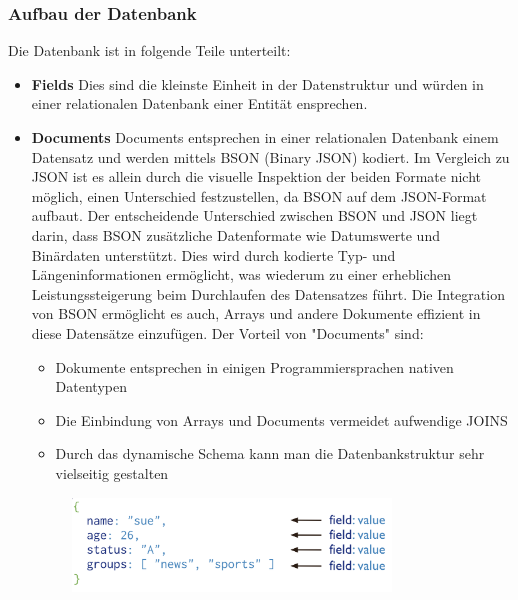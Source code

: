 \subsubsection{Aufbau der Datenbank}
Die Datenbank ist in folgende Teile unterteilt:

\begin{itemize}
    \item \textbf{Fields}
        \newline
        Dies sind die kleinste Einheit in der Datenstruktur und würden in einer relationalen Datenbank einer Entität ensprechen.
    \item \textbf{Documents}
        \newline
        Documents entsprechen in einer relationalen Datenbank einem Datensatz und werden mittels BSON (Binary JSON) kodiert. Im Vergleich zu JSON ist es allein durch die visuelle Inspektion der beiden Formate nicht möglich, einen Unterschied festzustellen, da BSON auf dem JSON-Format aufbaut.
        \newline
        Der entscheidende Unterschied zwischen BSON und JSON liegt darin, dass BSON zusätzliche Datenformate wie Datumswerte und Binärdaten unterstützt. Dies wird durch kodierte Typ- und Längeninformationen ermöglicht, was wiederum zu einer erheblichen Leistungssteigerung beim Durchlaufen des Datensatzes führt. Die Integration von BSON ermöglicht es auch, Arrays und andere Dokumente effizient in diese Datensätze einzufügen.
        \newline
        Der Vorteil von "Documents" sind:
        \begin{itemize}
            \item Dokumente entsprechen in einigen Programmiersprachen nativen Datentypen
            \item Die Einbindung von Arrays und Documents vermeidet aufwendige JOINS
            \item Durch das dynamische Schema kann man die Datenbankstruktur sehr vielseitig gestalten
        \end{itemize}
        \begin{figure}[h!]
            \centering
            \includegraphics[width=0.8\textwidth]{pics/document.png}

\end{figure}
\end{itemize}
